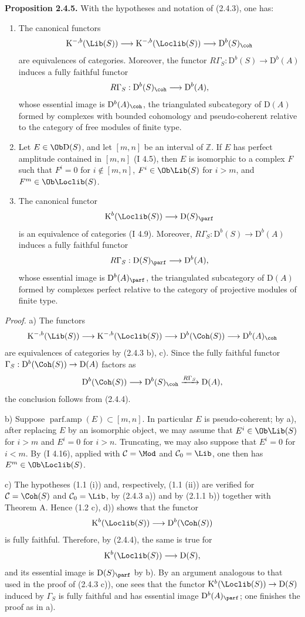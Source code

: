 \documentclass[11pt]{article}
\begin{document}
\textbf{Proposition 2.4.5.} With the hypotheses and notation of (2.4.3), one has:
\begin{enumerate}[label=\alph*)]
\item The canonical functors
\[
\mathrm K^{-,b}(\Lib(S))\longrightarrow\mathrm K^{-,b}(\Loclib(S))\longrightarrow \mathrm D^b(S)_{\coh}
\]
are equivalences of categories. Moreover, the functor $R\Gamma_S:\mathrm D^b(S)\to\mathrm D^b(A)$ induces a fully faithful functor
\[
R\Gamma_S:\mathrm D^b(S)_{\coh}\longrightarrow \mathrm D^b(A),
\]
whose essential image is $\mathrm D^b(A)_{\coh}$, the triangulated subcategory of $\mathrm D(A)$ formed by complexes with bounded cohomology and pseudo-coherent relative to the category of free modules of finite type.
\item Let $E\in\Ob\mathrm D(S)$, and let $[m,n]$ be an interval of $\mathbb Z$. If $E$ has perfect amplitude contained in $[m,n]$ (I 4.5), then $E$ is isomorphic to a complex $F$ such that $F^i=0$ for $i\notin[m,n]$, $F^i\in\Ob\Lib(S)$ for $i>m$, and $F^m\in\Ob\Loclib(S)$.
\item The canonical functor
\[
\mathrm K^b(\Loclib(S))\longrightarrow \mathrm D(S)_{\parf}
\]
is an equivalence of categories (I 4.9). Moreover, $R\Gamma_S:\mathrm D^b(S)\to\mathrm D^b(A)$ induces a fully faithful functor
\[
R\Gamma_S:\mathrm D(S)_{\parf}\longrightarrow\mathrm D^b(A),
\]
whose essential image is $\mathrm D^b(A)_{\parf}$, the triangulated subcategory of $\mathrm D(A)$ formed by complexes perfect relative to the category of projective modules of finite type.
\end{enumerate}

\emph{Proof.} a) The functors
\[
\mathrm K^{-,b}(\Lib(S))\longrightarrow\mathrm K^{-,b}(\Loclib(S))\longrightarrow
\mathrm D^b(\Coh(S))\longrightarrow\mathrm D^b(A)_{\coh}
\]
are equivalences of categories by (2.4.3 b), c). Since the fully faithful functor $\Gamma_S:\mathrm D^b(\Coh(S))\to\mathrm D(A)$ factors as
\[
\mathrm D^b(\Coh(S))\longrightarrow\mathrm D^b(S)_{\coh}\xrightarrow{R\Gamma_S}\mathrm D(A),
\]
the conclusion follows from (2.4.4).

b) Suppose $\operatorname{parf.amp}(E)\subset[m,n]$. In particular $E$ is pseudo-coherent; by a), after replacing $E$ by an isomorphic object, we may assume that $E^i\in\Ob\Lib(S)$ for $i>m$ and $E^i=0$ for $i>n$. Truncating, we may also suppose that $E^i=0$ for $i<m$. By (I 4.16), applied with $\mathcal C=\Mod$ and $\mathcal C_0=\Lib$, one then has $E^m\in\Ob\Loclib(S)$.

c) The hypotheses (1.1 (i)) and, respectively, (1.1 (ii)) are verified for $\mathcal C=\Coh(S)$ and $\mathcal C_0=\Lib$, by (2.4.3 a)) and by (2.1.1 b)) together with Theorem A. Hence (1.2 c), d)) shows that the functor
\[
\mathrm K^b(\Loclib(S))\longrightarrow\mathrm D^b(\Coh(S))
\]
is fully faithful. Therefore, by (2.4.4), the same is true for
\[
\mathrm K^b(\Loclib(S))\longrightarrow\mathrm D(S),
\]
and its essential image is $\mathrm D(S)_{\parf}$ by b). By an argument analogous to that used in the proof of (2.4.3 c)), one sees that the functor $\mathrm K^b(\Loclib(S))\to\mathrm D(S)$ induced by $\Gamma_S$ is fully faithful and has essential image $\mathrm D^b(A)_{\parf}$; one finishes the proof as in a).
\end{document}
